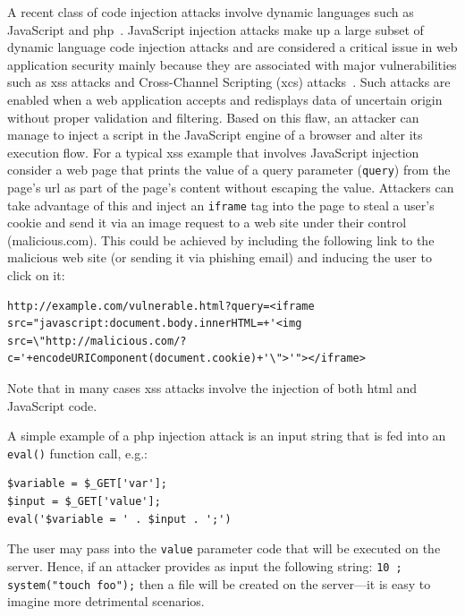 \documentclass[10pt,journal,compsoc]{IEEEtran}
\begin{document}
A recent class of code injection attacks involve dynamic languages
such as JavaScript and {\sc php}~\cite{SMS13}.
JavaScript injection attacks make up a large subset of dynamic
language code injection attacks and are considered a critical issue
in web application security mainly because they are associated with
major vulnerabilities such as {\sc xss} attacks and
Cross-Channel Scripting ({\sc xcs}) attacks~\cite{BBB09}.
Such attacks are enabled when a web application accepts
and redisplays data of uncertain origin without
proper validation and filtering. Based on this flaw, an attacker
can manage to inject a script in the JavaScript engine of a browser
and alter its execution flow.
For a typical {\sc xss} example that involves JavaScript injection
consider a web page that prints the value
of a query parameter ({\tt query}) from the
page's {\sc url} as part of the page's content
without escaping the value. Attackers
can take advantage of this and inject an {\tt iframe} tag
into the page to steal a user's cookie and
send it via an image request to a web site
under their control (malicious.com).
This could be achieved by including the following
link to the malicious web site (or sending it via phishing
email) and inducing the user to click on it:
\vspace{-0.5mm}
\lstset{language=HTML}
\begin{lstlisting}
http://example.com/vulnerable.html?query=<iframe src="javascript:document.body.innerHTML=+'<img src=\"http://malicious.com/?c='+encodeURIComponent(document.cookie)+'\">'"></iframe>
\end{lstlisting}
\vspace{-1mm}
\noindent
Note that in many cases {\sc xss} attacks
involve the injection of both {\sc html} and JavaScript code.

A simple example of a {\sc php} injection attack is an input string
that is fed into an {\tt eval()} function call, e.g.:
\vspace{-0.5mm}
\lstset{language=PHP}
\begin{lstlisting}
$variable = $_GET['var']; 
$input = $_GET['value'];
eval('$variable = ' . $input . ';')
\end{lstlisting}
\vspace{-0.5mm}
\noindent
The user may pass into the {\tt value} parameter code that will
be executed on the server. Hence, if an attacker provides as
input the following string: {\tt 10 ; system("touch foo");}
then a file will be created on the server---it is easy
to imagine more detrimental scenarios.
\end{document}
